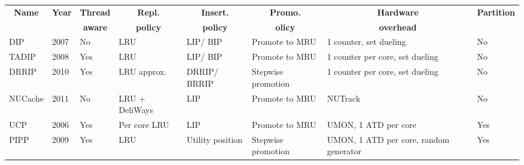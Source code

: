 \begin{table}[thb]
\begin{tabular}{p{1.4cm}p{0.5cm}p{0.8cm}p{1.2cm}p{1.2cm}p{1.4cm}p{1.2cm}p{1.0cm}}
\multicolumn{1}{c}{\textbf{Name}} & \multicolumn{1}{c}{\textbf{Year}} & \multicolumn{1}{c}{\textbf{Thread}} & \multicolumn{1}{c}{\textbf{Repl.}} & \multicolumn{1}{c}{\textbf{Insert.}} & \multicolumn{1}{c}{\textbf{Promo.}} & \multicolumn{1}{c}{\textbf{Hardware}}    & \multicolumn{1}{c}{\textbf{Partition}}     \\
\multicolumn{1}{c}{}          & \multicolumn{1}{c}{}          & \multicolumn{1}{c}{\textbf{aware}}  & \multicolumn{1}{c}{\textbf{policy}}      & \multicolumn{1}{c}{\textbf{policy}}    & \multicolumn{1}{c}{\textbf{olicy}}    & \multicolumn{1}{c}{\textbf{overhead}\footnotemark}  & \multicolumn{1}{c}{}       \\ 
\toprule
DIP                             & 2007                           & No                          & LRU                              & LIP/ BIP                        & Promote to MRU           & 1 counter, set dueling    & No            \\ \hline
TADIP                           & 2008                          & Yes                         & LRU                              & LIP/ BIP                       & Promote to MRU          & 1 counter per core, set dueling  & No          \\ \hline
DRRIP                           & 2010                          & Yes                         & LRU approx.                      & DRRIP/ BRRIP                    & Stepwise promotion            & 1 counter per core, set dueling  & No          \\ \hline
NUCache                         & 2011                         & No                          & LRU + DeliWays     & LIP                            & Promote to MRU                 & NUTrack                            & No    \\ \hline
UCP                            & 2006                           & Yes                         & Per core LRU                     & LIP                            & Promote to MRU                 & UMON, 1 ATD per core   & Yes                \\ \hline
PIPP                            & 2009                           & Yes                         & LRU                              & Utility position               & Stepwise promotion            & UMON, 1 ATD per core, random generator & Yes \\ \hline

\end{tabular}
\end{table}

